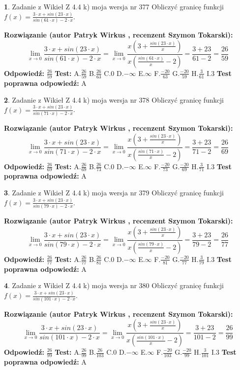 \documentclass[12pt, a4paper]{article}
\theoremstyle{definition} %
\newtheorem{zad}{}
\newcommand{\zadStart}[1]{\begin{zad}#1\newline}
\newcommand{\zadStop}{\end{zad}}
\newcommand{\rozwStart}[2]{\noindent \textbf{Rozwiązanie (autor #1 , recenzent #2): }\newline}
\newcommand{\rozwStop}{\newline}
\newcommand{\odpStart}{\noindent \textbf{Odpowiedź:}\newline}
\newcommand{\odpStop}{\newline}
\newcommand{\testStart}{\noindent \textbf{Test:}\newline}
\newcommand{\testStop}{\newline}
\newcommand{\kluczStart}{\noindent \textbf{Test poprawna odpowiedź:}\newline}
\newcommand{\kluczStop}{\newline}
\begin{document}
\zadStart{Zadanie z Wikieł Z 4.4 k) moja wersja nr 377}
Obliczyć granicę funkcji $f(x)=\frac{3\cdot x +sin(23\cdot x)}{sin(61\cdot x) -2\cdot x}$.
\zadStop
\rozwStart{Patryk Wirkus}{Szymon Tokarski}
$$\lim\limits_{x\to 0}\frac{3\cdot x +sin(23\cdot x)}{sin(61\cdot x) -2\cdot x}
=\lim\limits_{x\to 0}\frac{x(3+\frac{sin(23\cdot x)}{x})}{x(\frac{sin(61\cdot x)}{x}-2)}
=\frac{3+23}{61-2} = \frac{26}{59}$$
\rozwStop
\odpStart
$\frac{26}{59}$
\odpStop
\testStart
A.$\frac{26}{59}$
B.$\frac{26}{63}$
C.$0$
D.$-\infty$
E.$\infty$
F.$\frac{-20}{63}$
G.$\frac{-20}{59}$
H.$\frac{3}{61}$
I.$3$
\testStop
\kluczStart
A
\kluczStop



\zadStart{Zadanie z Wikieł Z 4.4 k) moja wersja nr 378}
Obliczyć granicę funkcji $f(x)=\frac{3\cdot x +sin(23\cdot x)}{sin(71\cdot x) -2\cdot x}$.
\zadStop
\rozwStart{Patryk Wirkus}{Szymon Tokarski}
$$\lim\limits_{x\to 0}\frac{3\cdot x +sin(23\cdot x)}{sin(71\cdot x) -2\cdot x}
=\lim\limits_{x\to 0}\frac{x(3+\frac{sin(23\cdot x)}{x})}{x(\frac{sin(71\cdot x)}{x}-2)}
=\frac{3+23}{71-2} = \frac{26}{69}$$
\rozwStop
\odpStart
$\frac{26}{69}$
\odpStop
\testStart
A.$\frac{26}{69}$
B.$\frac{26}{73}$
C.$0$
D.$-\infty$
E.$\infty$
F.$\frac{-20}{73}$
G.$\frac{-20}{69}$
H.$\frac{3}{71}$
I.$3$
\testStop
\kluczStart
A
\kluczStop



\zadStart{Zadanie z Wikieł Z 4.4 k) moja wersja nr 379}
Obliczyć granicę funkcji $f(x)=\frac{3\cdot x +sin(23\cdot x)}{sin(79\cdot x) -2\cdot x}$.
\zadStop
\rozwStart{Patryk Wirkus}{Szymon Tokarski}
$$\lim\limits_{x\to 0}\frac{3\cdot x +sin(23\cdot x)}{sin(79\cdot x) -2\cdot x}
=\lim\limits_{x\to 0}\frac{x(3+\frac{sin(23\cdot x)}{x})}{x(\frac{sin(79\cdot x)}{x}-2)}
=\frac{3+23}{79-2} = \frac{26}{77}$$
\rozwStop
\odpStart
$\frac{26}{77}$
\odpStop
\testStart
A.$\frac{26}{77}$
B.$\frac{26}{81}$
C.$0$
D.$-\infty$
E.$\infty$
F.$\frac{-20}{81}$
G.$\frac{-20}{77}$
H.$\frac{3}{79}$
I.$3$
\testStop
\kluczStart
A
\kluczStop



\zadStart{Zadanie z Wikieł Z 4.4 k) moja wersja nr 380}
Obliczyć granicę funkcji $f(x)=\frac{3\cdot x +sin(23\cdot x)}{sin(101\cdot x) -2\cdot x}$.
\zadStop
\rozwStart{Patryk Wirkus}{Szymon Tokarski}
$$\lim\limits_{x\to 0}\frac{3\cdot x +sin(23\cdot x)}{sin(101\cdot x) -2\cdot x}
=\lim\limits_{x\to 0}\frac{x(3+\frac{sin(23\cdot x)}{x})}{x(\frac{sin(101\cdot x)}{x}-2)}
=\frac{3+23}{101-2} = \frac{26}{99}$$
\rozwStop
\odpStart
$\frac{26}{99}$
\odpStop
\testStart
A.$\frac{26}{99}$
B.$\frac{26}{103}$
C.$0$
D.$-\infty$
E.$\infty$
F.$\frac{-20}{103}$
G.$\frac{-20}{99}$
H.$\frac{3}{101}$
I.$3$
\testStop
\kluczStart
A
\kluczStop
\end{document}
